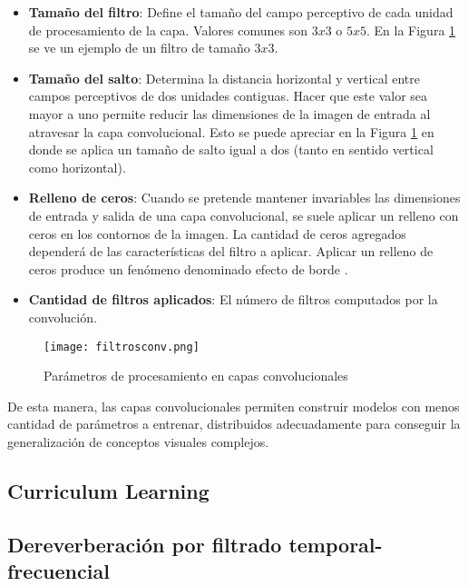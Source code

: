 \begin{itemize}
\item\textbf{Tamaño del filtro}: Define el tamaño del campo perceptivo de cada unidad de procesamiento de la capa. Valores comunes son $3x3$ o $5x5$. En la Figura \ref{fig:variables_conv} se ve un ejemplo de un filtro de tamaño $3x3$.

\item\textbf{Tamaño del salto}: Determina la distancia horizontal y vertical entre campos perceptivos de dos unidades contiguas. Hacer que este valor sea mayor a uno permite reducir las dimensiones de la imagen de entrada al atravesar la capa convolucional. Esto se puede apreciar en la Figura \ref{fig:variables_conv} en donde se aplica un tamaño de salto igual a dos (tanto en sentido vertical como horizontal). 

\item\textbf{Relleno de ceros}: Cuando se pretende mantener invariables las dimensiones de entrada y salida de una capa convolucional, se suele aplicar un relleno con ceros en los contornos de la imagen. La cantidad de ceros agregados dependerá de las características del filtro a aplicar. Aplicar un relleno de ceros produce un fenómeno denominado efecto de borde \cite{lagartija}. 

\item\textbf{Cantidad de filtros aplicados}: El número de filtros computados por la convolución. 

\end{itemize}

\begin{figure}[H]
  \centering{}
  \texttt{[image: filtrosconv.png]}
  \caption{Parámetros de procesamiento en capas convolucionales}
  \label{fig:variables_conv}
\end{figure}

De esta manera, las capas convolucionales permiten construir modelos con menos cantidad de parámetros a entrenar, distribuidos adecuadamente para conseguir la generalización de conceptos visuales complejos. 

\subsection{Curriculum Learning}


\subsection{Dereverberación por filtrado temporal-frecuencial}

